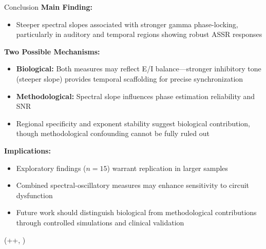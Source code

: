 \documentclass{beamer}
\newlength{\blockFour}
\begin{document}
\begin{frame}[t]
\begin{textblock*}{\colwidth}
\begin{block}{Conclusion}
	\textbf{Main Finding:}
	\begin{itemize}
		\item Steeper spectral slopes associated with stronger gamma phase-locking, particularly in auditory and temporal regions showing robust ASSR responses
	\end{itemize}
	
	\textbf{Two Possible Mechanisms:}
	\begin{itemize}
		\item \textbf{Biological:} Both measures may reflect E/I balance---stronger inhibitory tone (steeper slope) provides temporal scaffolding for precise synchronization \citep{waschke2021}
		\item \textbf{Methodological:} Spectral slope influences phase estimation reliability and SNR \citep{vandiepen2018CaveatsObservingInterTrial, samaha2022}

		\item Regional specificity and exponent stability suggest biological contribution, though methodological confounding cannot be fully ruled out
	\end{itemize}
	
	\textbf{Implications:}
	\begin{itemize}
		\item Exploratory findings ($n=15$) warrant replication in larger samples
		\item Combined spectral-oscillatory measures may enhance sensitivity to circuit dysfunction
		\item Future work should distinguish biological from methodological contributions through controlled simulations and clinical validation
	\end{itemize}
\end{block}

\end{textblock*}




\begin{textblock*}{\colwidth}(\leftmargin+\colwidth+\colsep, \blockFour)

\begin{block}{~}
\vspace{-0.333333\baselineskip}

\end{block}

\end{textblock*}





\end{frame}
\end{document}
